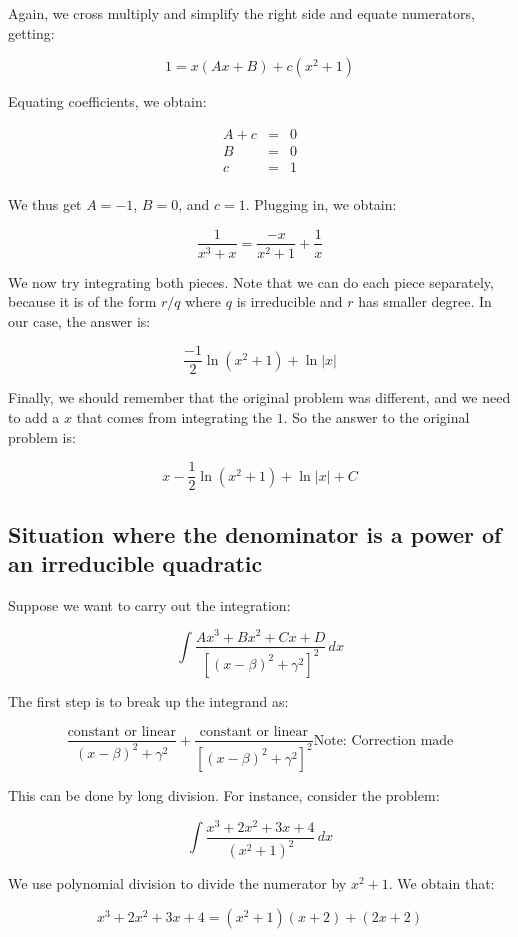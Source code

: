 \documentclass[10pt]{amsart}
\begin{document}
Again, we cross multiply and simplify the right side and equate
numerators, getting:

$$1 = x(Ax + B) + c(x^2 + 1)$$

Equating coefficients, we obtain:

\begin{eqnarray*}
  A + c & = & 0\\
  B & = & 0 \\
  c & = & 1 \\
\end{eqnarray*}

We thus get $A = -1$, $B = 0$, and $c = 1$. Plugging in, we obtain:

$$\frac{1}{x^3 + x} = \frac{-x}{x^2 + 1} + \frac{1}{x}$$

We now try integrating both pieces. Note that we can do each piece
separately, because it is of the form $r/q$ where $q$ is irreducible
and $r$ has smaller degree. In our case, the answer is:

$$\frac{-1}{2} \ln(x^2 + 1) + \ln|x|$$

Finally, we should remember that the original problem was different,
and we need to add a $x$ that comes from integrating the $1$. So the
answer to the original problem is:

$$x - \frac{1}{2}\ln(x^2 + 1) + \ln|x| + C$$

\subsection{Situation where the denominator is a power of an irreducible quadratic}

Suppose we want to carry out the integration:

$$\int \frac{Ax^3 + Bx^2 + Cx + D}{[(x - \beta)^2 + \gamma^2]^2} \, dx$$

The first step is to break up the integrand as:

$$\frac{\text{constant or linear}}{(x - \beta)^2 + \gamma^2} + \frac{\text{constant or linear}}{[(x - \beta)^2 + \gamma^2]^2} \text{Note: Correction made}$$

This can be done by long division. For instance, consider the problem:

$$\int \frac{x^3 + 2x^2 + 3x + 4}{(x^2 + 1)^2} \, dx$$

We use polynomial division to divide the numerator by $x^2 + 1$. We
obtain that:

$$x^3 + 2x^2 + 3x + 4 = (x^2 + 1)(x + 2) + (2x + 2)$$
\end{document}
